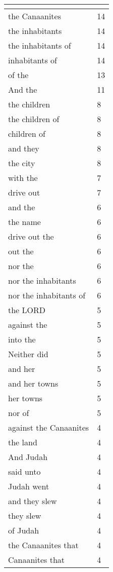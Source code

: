 \begin{center}
\begin{longtable}{|p{3.0in}|p{0.5in}|}
\hline \multicolumn{2}{c}{{ }} \\ \hline
\endfoot 
the Canaanites & 14\\ \hline 
the inhabitants & 14\\ \hline 
the inhabitants of & 14\\ \hline 
inhabitants of & 14\\ \hline 
of the & 13\\ \hline 
And the & 11\\ \hline 
the children & 8\\ \hline 
the children of & 8\\ \hline 
children of & 8\\ \hline 
and they & 8\\ \hline 
the city & 8\\ \hline 
with the & 7\\ \hline 
drive out & 7\\ \hline 
and the & 6\\ \hline 
the name & 6\\ \hline 
drive out the & 6\\ \hline 
out the & 6\\ \hline 
nor the & 6\\ \hline 
nor the inhabitants & 6\\ \hline 
nor the inhabitants of & 6\\ \hline 
the LORD & 5\\ \hline 
against the & 5\\ \hline 
into the & 5\\ \hline 
Neither did & 5\\ \hline 
and her & 5\\ \hline 
and her towns & 5\\ \hline 
her towns & 5\\ \hline 
nor of & 5\\ \hline 
against the Canaanites & 4\\ \hline 
the land & 4\\ \hline 
And Judah & 4\\ \hline 
said unto & 4\\ \hline 
Judah went & 4\\ \hline 
and they slew & 4\\ \hline 
they slew & 4\\ \hline 
of Judah & 4\\ \hline 
the Canaanites that & 4\\ \hline 
Canaanites that & 4\\ \hline 

\end{longtable}
\end{center}
